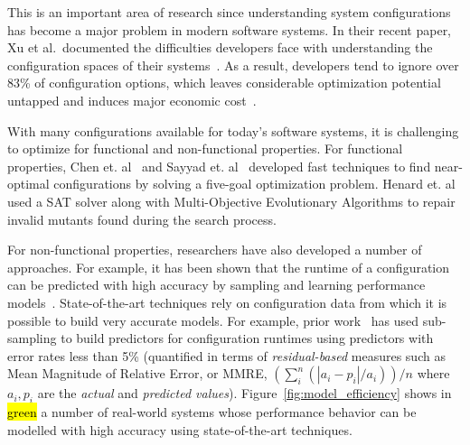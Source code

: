 \documentclass[sigconf]{acmart}
\DeclareRobustCommand{\hlgreen}[1]{{\sethlcolor{Mygreen}\textcolor{white}{\hl{#1}}}}
\begin{document}
This is an important area of research since understanding system configurations
has become a major problem in modern software systems. 
In their recent paper, Xu et al.\ documented the  difficulties developers face
with understanding  the configuration spaces of their systems~\cite{xu2015hey}. As a result, developers tend to ignore over 83\% of configuration options, which leaves considerable optimization potential untapped and induces major economic cost~\cite{xu2015hey}.


With many configurations available for today's software systems, it is challenging to optimize for functional and non-functional properties. For functional properties, Chen et. al~\cite{chen2016sampling} and Sayyad et. al~\cite{sayyad2013scalable} developed fast techniques to find near-optimal configurations by solving a five-goal optimization problem. Henard et. al~\cite{henard2015combining} used a SAT solver along with Multi-Objective Evolutionary Algorithms to repair invalid mutants found during the search process. 

For non-functional properties, researchers have also developed a number of approaches. For example, it has been shown that the runtime of
a configuration can be predicted with high accuracy by sampling and learning performance models~\cite{siegmund2012predicting,guo2013variability,sarkar2015cost}. 
State-of-the-art techniques rely on configuration data from which it is possible to build very accurate models. For example, prior work~\cite{nair2017faster} has used sub-sampling to build predictors for configuration runtimes using predictors with error
rates less than 5\% (quantified in terms of \emph{residual-based} measures such as Mean Magnitude of Relative Error, or  MMRE, $(\sum_i^n  (|a_i - p_i|/a_i))/n$ where $a_i,p_i$ are the
{\em actual} and {\em predicted values}).
Figure~\ref{fig:model_efficiency} shows in \hlgreen{green} a number of real-world systems 
whose performance behavior can be modelled with high accuracy using state-of-the-art techniques.
\end{document}
